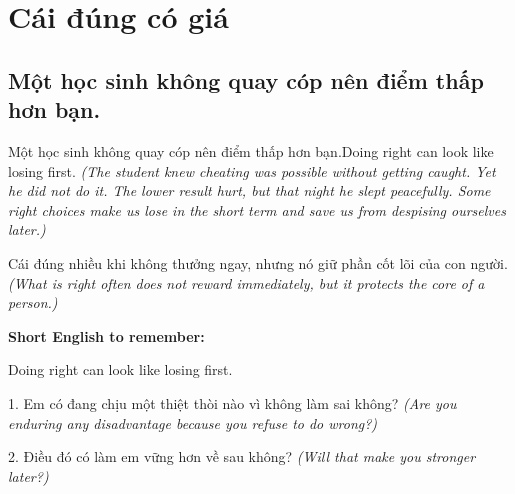 \chapter{Cái đúng có giá}

\section{Một học sinh không quay cóp nên điểm thấp hơn bạn.}
\begin{truyen}{Một học sinh không quay cóp nên điểm thấp hơn bạn.}{Doing right can look like losing first.}
\textit{(The student knew cheating was possible without getting caught. Yet he did not do it. The lower result hurt, but that night he slept peacefully. Some right choices make us lose in the short term and save us from despising ourselves later.)}
\end{truyen}
\begin{baihoc}
Cái đúng nhiều khi không thưởng ngay, nhưng nó giữ phần cốt lõi của con người.
\textit{(What is right often does not reward immediately, but it protects the core of a person.)}
\end{baihoc}
\begin{ghinhoanh}\textbf{Short English to remember:}

Doing right can look like losing first.
\end{ghinhoanh}
\begin{tuhocnhanh}
1. Em có đang chịu một thiệt thòi nào vì không làm sai không? \textit{(Are you enduring any disadvantage because you refuse to do wrong?)}

2. Điều đó có làm em vững hơn về sau không? \textit{(Will that make you stronger later?)}
\end{tuhocnhanh}
\ngancach

